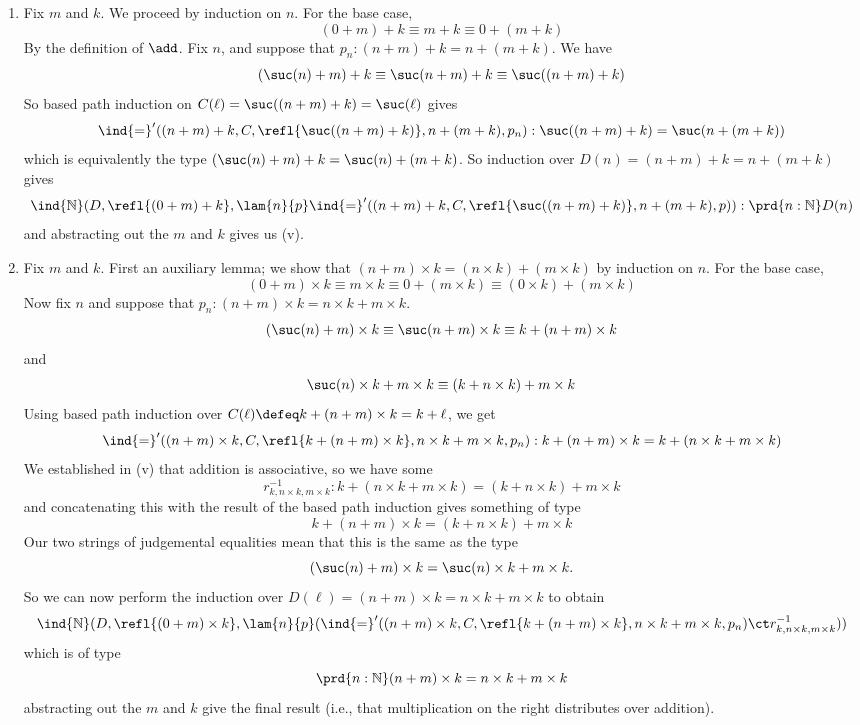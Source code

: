 \begin{enumerate}
\item Fix $m$ and $k$.  We proceed by induction on $n$.  For the base case,
\[
  (0 + m) + k \equiv m + k \equiv 0 + (m + k)
\]
By the definition of $\add$.  Fix $n$, and suppose that $p_{n} : (n + m) + k =
n + (m + k)$.  We have
\[
  (\suc(n) + m) + k
  \equiv \suc(n + m) + k
  \equiv \suc((n+m)+k)
\]
So based path induction on $C(\ell) = \suc((n+m)+k) = \suc(\ell)$ gives
\[
  \ind{=}'((n+m)+k, C, \refl{\suc((n+m)+k)}, n+(m+k), p_{n})
  :
  \suc((n+m)+k) = \suc(n+(m+k))
\]
which is equivalently the type $(\suc(n)+m)+k = \suc(n) + (m + k)$.  So
induction over $D(n) = (n+m)+k = n+(m+k)$ gives
\[
  \ind{\mathbb{N}}(D, \refl{(0+m)+k}, 
  \lam{n}{p}
  \ind{=}'((n+m)+k, C, \refl{\suc((n+m)+k)}, n+(m+k), p)
  )
  :
  \prd{n:\mathbb{N}}D(n)
\]
and abstracting out the $m$ and $k$ gives us (v).

\item Fix $m$ and $k$.  First an auxiliary lemma; we show that $(n+m) \times k
= (n \times k) + (m \times k)$ by induction on $n$.  For the base case,
\[
  (0+m) \times k \equiv m \times k \equiv 0 + (m \times k) \equiv (0 \times k)
  + (m \times k)
\]
Now fix $n$ and suppose that $p_{n} : (n+m) \times k = n \times k + m \times
k$.
\[
  (\suc(n) + m) \times k
  \equiv \suc(n + m) \times k
  \equiv k + (n + m) \times k
\]
and
\[
  \suc(n) \times k + m \times k
  \equiv 
  (k + n \times k) + m \times k
\]
Using based path induction over $C(\ell) \defeq k + (n + m) \times k = k +
\ell$, we get
\[
\ind{=}'((n+m)\times k, C, \refl{k+(n+m)\times k}, n \times k + m \times
k, p_{n})
  :
  k + (n+m) \times k = k + (n \times k + m \times k)
\]
We established in (v) that addition is associative, so we have some
\[
  r_{k, n \times k, m \times k}^{-1} 
  : k + (n \times k + m \times k) = (k + n
  \times k) + m \times k
\]
and concatenating this with the result of the based path induction gives
something of type
\[
  k + (n + m) \times k = (k + n \times k) + m \times k
\]
Our two strings of judgemental equalities mean that this is the same as the
type
\[
  (\suc(n) + m) \times k = \suc(n) \times k + m \times k.
\]
So we can now perform the induction over $D(\ell) = (n + m) \times k = n \times
k + m \times k$ to obtain
\[
  \ind{\mathbb{N}}(D, \refl{(0+m) \times k}, 
  \lam{n}{p}(
\ind{=}'((n+m)\times k, C, \refl{k+(n+m)\times k}, n \times k + m \times
k, p_{n})
\ct
  r_{k, n \times k, m \times k}^{-1})
  )
\]
which is of type
\[
  \prd{n : \mathbb{N}} (n+m) \times k = n \times k + m \times k
\]
abstracting out the $m$ and $k$ give the final result (i.e., that
multiplication on the right distributes over addition).


\end{enumerate}
